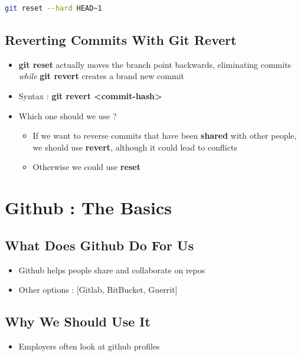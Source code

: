 \documentclass{report}
\begin{document}
\begin{tcolorbox}[title=Example,colback=backcolour]
\begin{lstlisting}[language=bash]
git reset --hard HEAD~1
\end{lstlisting}
\end{tcolorbox}


\section{Reverting Commits With Git Revert}

\begin{itemize}
	\item \textbf{git reset} actually moves the branch point backwards, eliminating commits \textit{while} \textbf{git revert} creates a brand new commit 
	\item Syntax : \textbf{git revert <commit-hash>} 
	\item Which one should we use ?
		\begin{itemize}
			\item If we want to reverse commits that have been \textbf{shared} with other people, we should use \textbf{revert}, although it could lead to conflicts 
			\item Otherwise we could use \textbf{reset} 
		\end{itemize}
\end{itemize}



\chapter{Github : The Basics}


\section{What Does Github Do For Us}

\begin{itemize}
	\item Github helps people share and collaborate on repos 
	\item Other options : [Gitlab, BitBucket, Guerrit]
\end{itemize}


\section{Why We Should Use It}

\begin{itemize}
	\item Employers often look at github profiles
\end{itemize}
\end{document}
